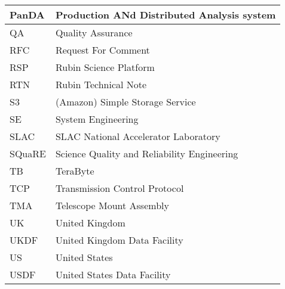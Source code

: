 \begin{longtable}{p{}p{}}
PanDA &  Production ANd Distributed Analysis system \\\hline
QA & Quality Assurance \\\hline
RFC & Request For Comment \\\hline
RSP & Rubin Science Platform \\\hline
RTN & Rubin Technical Note \\\hline
S3 & (Amazon) Simple Storage Service  \\\hline
SE & System Engineering \\\hline
SLAC & SLAC National Accelerator Laboratory \\\hline
SQuaRE & Science Quality and Reliability Engineering \\\hline
TB & TeraByte \\\hline
TCP & Transmission Control Protocol \\\hline
TMA & Telescope Mount Assembly \\\hline
UK & United Kingdom \\\hline
UKDF & United Kingdom Data Facility \\\hline
US & United States \\\hline
USDF & United States Data Facility \\\hline
\end{longtable}
